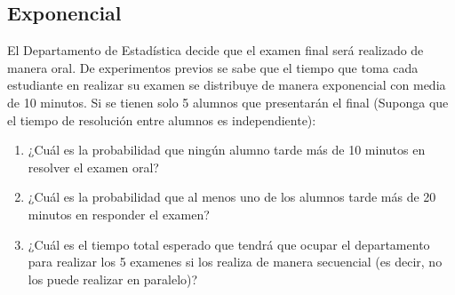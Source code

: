\documentclass[addpoints]{exam}
\theoremstyle{mytheor}
\begin{document}
\begin{questions}
\section*{Exponencial}
\question El Departamento de Estadística decide que el examen final será realizado de manera oral. De experimentos previos se sabe que el tiempo que toma cada estudiante en realizar su examen se distribuye de manera exponencial con media de 10 minutos. Si se tienen solo 5 alumnos que presentarán el final (Suponga que el tiempo de resolución entre alumnos es independiente):

\begin{enumerate}
\item ¿Cuál es la probabilidad que ningún alumno tarde más de 10 minutos en resolver el examen oral?
\item ¿Cuál es la probabilidad que al menos uno de los alumnos tarde más de 20 minutos en responder el examen?
\item  ¿Cuál es el tiempo total esperado que tendrá que ocupar el departamento para realizar los 5 examenes si los realiza de manera secuencial (es decir, no los puede realizar en paralelo)?
\end{enumerate}
   
\end{questions} 
\end{document}
